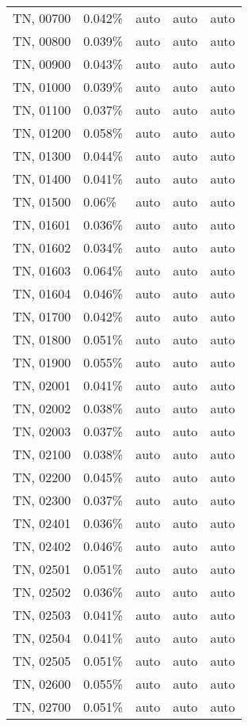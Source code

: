 \begin{longtable}[]{@{}lllll@{}}
TN, 00700 & 0.042\% & auto & auto & auto \\
TN, 00800 & 0.039\% & auto & auto & auto \\
TN, 00900 & 0.043\% & auto & auto & auto \\
TN, 01000 & 0.039\% & auto & auto & auto \\
TN, 01100 & 0.037\% & auto & auto & auto \\
TN, 01200 & 0.058\% & auto & auto & auto \\
TN, 01300 & 0.044\% & auto & auto & auto \\
TN, 01400 & 0.041\% & auto & auto & auto \\
TN, 01500 & 0.06\% & auto & auto & auto \\
TN, 01601 & 0.036\% & auto & auto & auto \\
TN, 01602 & 0.034\% & auto & auto & auto \\
TN, 01603 & 0.064\% & auto & auto & auto \\
TN, 01604 & 0.046\% & auto & auto & auto \\
TN, 01700 & 0.042\% & auto & auto & auto \\
TN, 01800 & 0.051\% & auto & auto & auto \\
TN, 01900 & 0.055\% & auto & auto & auto \\
TN, 02001 & 0.041\% & auto & auto & auto \\
TN, 02002 & 0.038\% & auto & auto & auto \\
TN, 02003 & 0.037\% & auto & auto & auto \\
TN, 02100 & 0.038\% & auto & auto & auto \\
TN, 02200 & 0.045\% & auto & auto & auto \\
TN, 02300 & 0.037\% & auto & auto & auto \\
TN, 02401 & 0.036\% & auto & auto & auto \\
TN, 02402 & 0.046\% & auto & auto & auto \\
TN, 02501 & 0.051\% & auto & auto & auto \\
TN, 02502 & 0.036\% & auto & auto & auto \\
TN, 02503 & 0.041\% & auto & auto & auto \\
TN, 02504 & 0.041\% & auto & auto & auto \\
TN, 02505 & 0.051\% & auto & auto & auto \\
TN, 02600 & 0.055\% & auto & auto & auto \\
TN, 02700 & 0.051\% & auto & auto & auto \\

\end{longtable}
